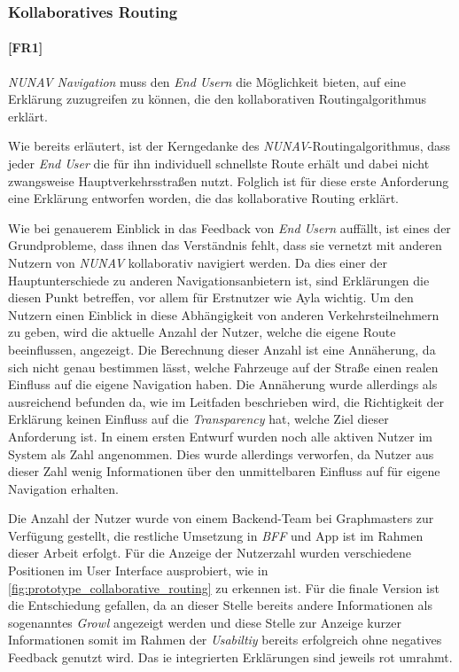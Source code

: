 \subsubsection{Kollaboratives Routing}
\label{sec:user_count_definition}

\paragraph{[FR1]} \textit{NUNAV Navigation} muss den \textit{End Usern} die Möglichkeit bieten, auf eine Erklärung zuzugreifen zu können, die den kollaborativen Routingalgorithmus erklärt.

\bigskip

Wie bereits erläutert, ist der Kerngedanke des \textit{NUNAV}-Routingalgorithmus, dass jeder \textit{End User} die für ihn individuell schnellste Route erhält und dabei nicht zwangsweise Hauptverkehrsstraßen nutzt. Folglich ist für diese erste Anforderung eine Erklärung entworfen worden, die das kollaborative Routing erklärt.

Wie bei genauerem Einblick in das Feedback von \textit{End Usern} auffällt, ist eines der Grundprobleme, dass ihnen das Verständnis fehlt, dass sie vernetzt mit anderen Nutzern von \textit{NUNAV} kollaborativ navigiert werden. Da dies einer der Hauptunterschiede zu anderen Navigationsanbietern ist, sind Erklärungen die diesen Punkt betreffen, vor allem für Erstnutzer wie Ayla wichtig. Um den Nutzern einen Einblick in diese Abhängigkeit von anderen Verkehrsteilnehmern zu geben, wird die aktuelle Anzahl der Nutzer, welche die eigene Route beeinflussen, angezeigt. Die Berechnung dieser Anzahl ist eine Annäherung, da sich nicht genau bestimmen lässt, welche Fahrzeuge auf der Straße einen realen Einfluss auf die eigene Navigation haben. Die Annäherung wurde allerdings als ausreichend befunden da, wie im Leitfaden beschrieben wird, die Richtigkeit der Erklärung keinen Einfluss auf die \textit{Transparency} hat, welche Ziel dieser Anforderung ist. In einem ersten Entwurf wurden noch alle aktiven Nutzer im System als Zahl angenommen. Dies wurde allerdings verworfen, da Nutzer aus dieser Zahl wenig Informationen über den unmittelbaren Einfluss auf für eigene Navigation erhalten.

Die Anzahl der Nutzer wurde von einem Backend-Team bei Graphmasters zur Verfügung gestellt, die restliche Umsetzung in \textit{BFF} und App ist im Rahmen dieser Arbeit erfolgt. Für die Anzeige der Nutzerzahl wurden verschiedene Positionen im User Interface ausprobiert, wie in \autoref{fig:prototype_collaborative_routing} zu erkennen ist. Für die finale Version ist die Entschiedung gefallen, da an dieser Stelle bereits andere Informationen als sogenanntes \textit{Growl} angezeigt werden und diese Stelle zur Anzeige kurzer Informationen somit im Rahmen der \textit{Usabiltiy} bereits erfolgreich ohne negatives Feedback genutzt wird. Das ie integrierten Erklärungen sind jeweils rot umrahmt.

